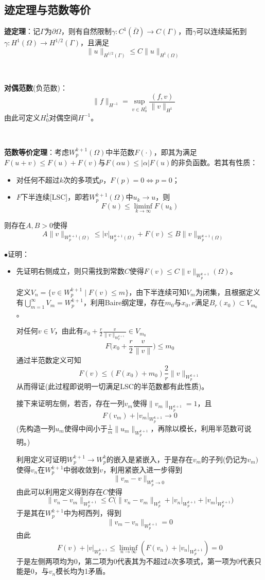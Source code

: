 \documentclass[a4paper,UTF8,fontset=windows]{ctexart}
\newcommand{\proo}[1]{{\kaishu $\bullet$证明：
\begin{itemize}
    \item[] #1
\end{itemize}
}}
\begin{document}
\subsection{迹定理与范数等价}

\textbf{迹定理}：记$\Gamma$为$\partial\Omega$，则有自然限制$\gamma:C^1(\bar{\Omega})\to C(\Gamma)$，而$\gamma$可以连续延拓到$\gamma:H^1(\Omega)\to H^{1/2}(\Gamma)$，且满足
$$\|u\|_{H^{1/2}(\Gamma)}\le C\|u\|_{H^1(\Omega)}$$

\

\textbf{对偶范数}(负范数)：
$$\|f\|_{H^{-1}}=\sup_{v\in H_0^1}\frac{(f,v)}{\|v\|_{H^1}}$$
由此可定义$H_0^1$对偶空间$H^{-1}$。

\

\textbf{范数等价定理}：考虑$W_p^{k+1}(\Omega)$中半范数$F(\cdot)$，即其为满足$F(u+v)\le F(u)+F(v)$与$F(\alpha u)\le|\alpha| F(u)$的非负函数。若其有性质：
\begin{itemize}
    \item 对任何不超过$k$次的多项式$p$，$F(p)=0\Leftrightarrow p=0$；
    \item $F$下半连续[LSC]，即若$W_p^{k+1}(\Omega)$中$u_k\to u$，则
    $$F(u)\le\liminf_{k\to\infty}F(u_k)$$
\end{itemize}
则存在$A,B>0$使得
$$A\|v\|_{W_p^{k+1}(\Omega)}\le |v|_{W_p^{k+1}(\Omega)}+F(v)\le B\|v\|_{W_p^{k+1}(\Omega)}$$

\proo{
    先证明右侧成立，则只需找到常数$C$使得$F(v)\le C\|v\|_{W_p^{k+1}}(\Omega)$。

    定义$V_n=\{v\in W_p^{k+1}\mid F(v)\le m\}$，由下半连续可知$V_m$为闭集，且根据定义有$\bigcup_{m=1}^\infty V_m=W_p^{k+1}$，利用Baire纲定理，存在$m_0$与$x_0,r$满足$B_r(x_0)\subset V_{m_0}$。

    对任何$v\in V$，由此有$x_0+\frac{r}{2}\frac{v}{\|v\|_{W_p^{k+1}}}\in V_{m_0}$
    $$F\bigg(x_0+\frac{r}{2}\frac{v}{\|v\|}\bigg)\le m_0$$
    通过半范数定义可知
    $$F(v)\le(F(x_0)+m_0)\frac{2}{r}\|v\|_{W_p^{k+1}}$$
    从而得证(此过程即说明一切满足LSC的半范数都有此性质)。

    接下来证明左侧，若否，存在一列$v_m$使得$\|v_m\|_{W_p^{k+1}}=1$，且
    $$F(v_m)+|v_m|_{W_p^{k+1}}\to 0$$
    (先构造一列$u_m$使得中间小于$\frac{1}{m}\|u_m\|_{W_p^{k+1}}$，再除以模长，利用半范数可说明。)

    利用定义可证明$W_p^{k+1}\to W_p^k$的嵌入是紧嵌入，于是存在$v_m$的子列(仍记为$v_m)$使得$v_n$在$W_p^{k+1}$中弱收敛到$v$，利用紧嵌入进一步得到
    $$\|v_m-v\|_{W_p^k\to0}$$
    由此可以利用定义得到存在$C$使得
    $$\|v_n-v_m\|_{W_p^{k+1}}\le C\big(\|v_n-v_m\|_{W_p^k}+|v_n|_{W_p^{k+1}}+|v_m|_{W_p^{k+1}}\big)$$
    于是其在$W_p^{k+1}$中为柯西列，得到
    $$\|v_m-v_n\|_{W_p^{k+1}}=0$$
    由此
    $$F(v)+|v|_{W^{k+1}_p}\le\liminf_{n\to\infty}(F(v_n)+|v_n|_{W^{k+1}_p})=0$$
    于是左侧两项均为0，第二项为0代表其为不超过$k$次多项式，第一项为0代表只能是0，与$v_n$模长均为1矛盾。
}
\end{document}
